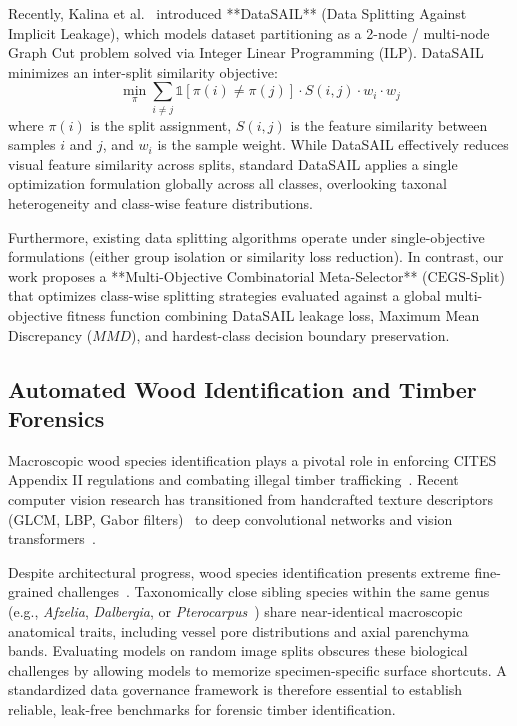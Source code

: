 Recently, Kalina et al.~\cite{kalina2023} introduced **DataSAIL** (Data Splitting Against Implicit Leakage), which models dataset partitioning as a 2-node / multi-node Graph Cut problem solved via Integer Linear Programming (ILP). DataSAIL minimizes an inter-split similarity objective:
\begin{equation}
\min_{\pi} \sum_{i \neq j} \mathbb{1}[\pi(i) \neq \pi(j)] \cdot S(i, j) \cdot w_i \cdot w_j
\end{equation}
where $\pi(i)$ is the split assignment, $S(i, j)$ is the feature similarity between samples $i$ and $j$, and $w_i$ is the sample weight. While DataSAIL effectively reduces visual feature similarity across splits, standard DataSAIL applies a single optimization formulation globally across all classes, overlooking taxonal heterogeneity and class-wise feature distributions.

Furthermore, existing data splitting algorithms operate under single-objective formulations (either group isolation or similarity loss reduction). In contrast, our work proposes a **Multi-Objective Combinatorial Meta-Selector** ($\text{CEGS-Split}$) that optimizes class-wise splitting strategies evaluated against a global multi-objective fitness function combining DataSAIL leakage loss, Maximum Mean Discrepancy ($MMD$), and hardest-class decision boundary preservation.

\subsection{Automated Wood Identification and Timber Forensics}
Macroscopic wood species identification plays a pivotal role in enforcing CITES Appendix II regulations and combating illegal timber trafficking~\cite{cites,dormontt2015}. Recent computer vision research has transitioned from handcrafted texture descriptors (GLCM, LBP, Gabor filters)~\cite{woodreview} to deep convolutional networks and vision transformers~\cite{fabijanska2021,wu2021,ravindran2022,song2025}.

Despite architectural progress, wood species identification presents extreme fine-grained challenges~\cite{wiedenhoeft2011}. Taxonomically close sibling species within the same genus (e.g., \textit{Afzelia}, \textit{Dalbergia}, or \textit{Pterocarpus}~\cite{liu2025}) share near-identical macroscopic anatomical traits, including vessel pore distributions and axial parenchyma bands. Evaluating models on random image splits obscures these biological challenges by allowing models to memorize specimen-specific surface shortcuts. A standardized data governance framework is therefore essential to establish reliable, leak-free benchmarks for forensic timber identification.
